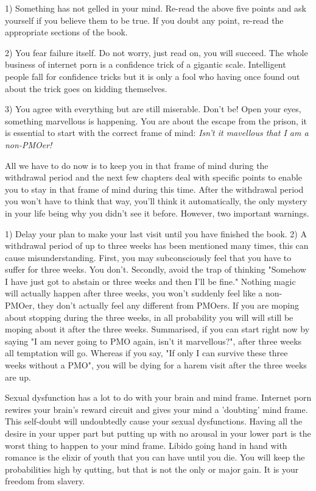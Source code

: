   1) Something has not gelled in your mind. Re-read the above five points and ask yourself if you believe them to be true. If you doubt any point, re-read the appropriate sections of the book.

  2) You fear failure itself. Do not worry, just read on, you will succeed. The whole business of internet porn is a confidence trick of a gigantic scale. Intelligent people fall for confidence tricks but it is only a fool who having once found out about the trick goes on kidding themselves.

  3) You agree with everything but are still miserable. Don't be! Open your eyes, something marvellous is happening. You are about the escape from the prison, it is essential to start with the correct frame of mind: \textit{Isn't it mavellous that I am a non-PMOer!}

All we have to do now is to keep you in that frame of mind during the withdrawal period and the next few chapters deal with specific points to enable you to stay in that frame of mind during this time. After the withdrawal period you won't have to think that way, you'll think it automatically, the only mystery in your life being why you didn't see it before. However, two important warnings.

  1) Delay your plan to make your last visit until you have finished the book.
  2) A withdrawal period of up to three weeks has been mentioned many times, this can cause misunderstanding. First, you may subconsciously feel that you have to suffer for three weeks. You don't. Secondly, avoid the trap of thinking "Somehow I have just got to abstain or three weeks and then I'll be fine." Nothing magic will actually happen after three weeks, you won't suddenly feel like a non-PMOer, they don't actually feel any different from PMOers. If you are moping about stopping during the three weeks, in all probability you will will still be moping about it after the three weeks. Summarised, if you can start right now by saying "I am never going to PMO again, isn't it marvellous?", after three weeks all temptation will go. Whereas if you say, "If only I can survive these three weeks without a PMO", you will be dying for a harem visit after the three weeks are up.

Sexual dysfunction has a lot to do with your brain and mind frame. Internet porn rewires your brain's reward circuit and gives your mind a 'doubting' mind frame. This self-doubt will undoubtedly cause your sexual dysfunctions. Having all the desire in your upper part but putting up with no arousal in your lower part is the worst thing to happen to your mind frame. Libido going hand in hand with romance is the elixir of youth that you can have until you die. You will keep the probabilities high by qutting, but that is not the only or major gain. It is your freedom from slavery.
